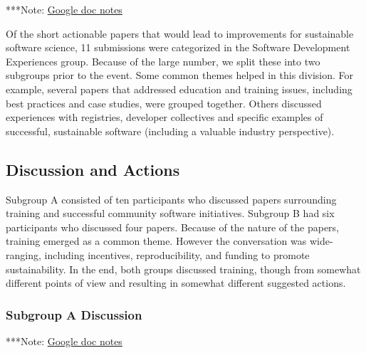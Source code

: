 \documentclass[11pt, oneside]{amsart}
\newcommand{\note}[1]{ {\textcolor{blueish}    { ***Note:      #1 }}}
\begin{document}
\note{\href{http://tinyurl.com/pn4eq8z}{Google doc notes}}

Of the short actionable papers that would lead to improvements for sustainable
software science, 11 submissions were categorized in the Software Development
Experiences group. Because of the large number, we split these into two
subgroups prior to the event. Some common themes helped in this division. For
example, several papers that addressed education and training issues, including
best practices and case studies, were grouped together. Others discussed
experiences with registries, developer collectives and specific examples of
successful, sustainable software (including a valuable industry perspective).

\subsection{Discussion and Actions}

Subgroup A consisted of ten participants who discussed papers surrounding training
and successful community software initiatives.
Subgroup B had six participants who discussed four papers. Because of the nature
of the papers, training emerged as a common theme. However the conversation was
wide-ranging, including incentives, reproducibility, and funding to promote
sustainability.  In the end, both groups discussed training, though from somewhat different
points of view and resulting in somewhat different suggested actions.

\subsubsection{Subgroup A Discussion}

\note{\href{https://docs.google.com/document/d/1n413NcFPDyDGb27tEp-ujryiRhz-ZaAhmUapWRYmh1g/edit}{Google doc notes}}
\end{document}
